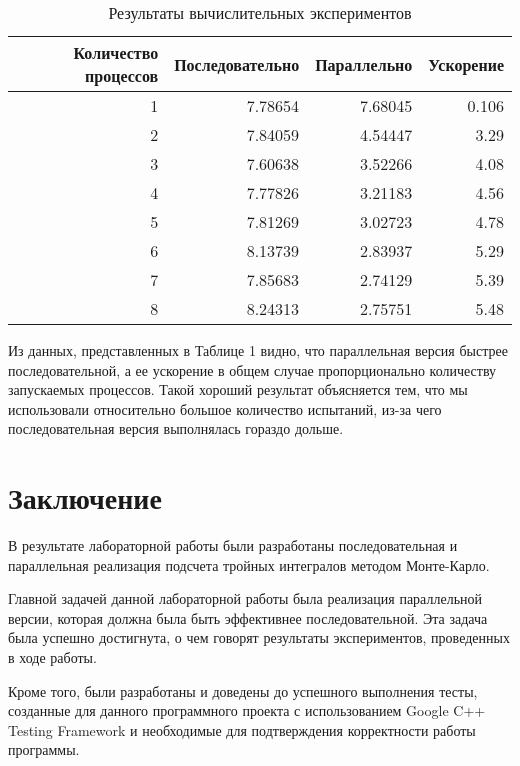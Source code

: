 \documentclass{report}
\begin{document}
\begin{table}[!h]
\caption{Результаты вычислительных экспериментов}
\centering
\begin{tabular}{| r | r | r | r |}
\hline
Количество процессов & Последовательно & Параллельно & Ускорение  \\[5pt]
\hline
1        & 7.78654        & 7.68045     & 0.106       \\
2        & 7.84059        & 4.54447     & 3.29       \\
3        & 7.60638        & 3.52266     & 4.08       \\
4        & 7.77826        & 3.21183     & 4.56       \\
5        & 7.81269        & 3.02723     & 4.78       \\
6        & 8.13739        & 2.83937     & 5.29       \\
7        & 7.85683        & 2.74129     & 5.39	    \\
8        & 8.24313        & 2.75751     & 5.48	  \\
\hline
\end{tabular}
\end{table}

\par Из данных, представленных в Таблице 1 видно, что параллельная версия быстрее последовательной, а ее ускорение в общем случае пропорционально количеству запускаемых процессов. Такой хороший результат объясняется тем, что мы использовали относительно большое количество испытаний, из-за чего последовательная версия выполнялась гораздо дольше.
\newpage

\section*{Заключение}
В результате лабораторной работы были разработаны последовательная и параллельная реализация подсчета тройных интегралов методом Монте-Карло.
\par Главной задачей данной лабораторной работы была реализация параллельной версии, которая должна была быть эффективнее последовательной. Эта задача была успешно достигнута, о чем говорят результаты экспериментов, проведенных в ходе работы.
\par Кроме того, были разработаны и доведены до успешного выполнения тесты, созданные для данного программного проекта с использованием Google C++ Testing Framework и необходимые для подтверждения корректности работы программы.
\newpage
\end{document}

